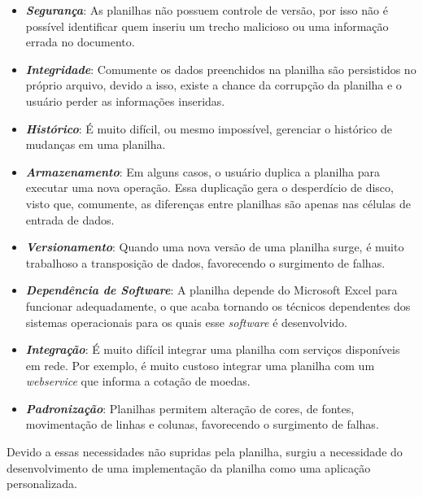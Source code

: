 \begin{itemize}
    
    \item \textit{\textbf{Segurança}}: As planilhas não possuem controle de versão, por isso não é possível identificar quem inseriu um trecho malicioso ou uma informação errada no documento.

    \item \textit{\textbf{Integridade}}: Comumente os dados preenchidos na planilha são persistidos no próprio arquivo, devido a isso, existe a chance da corrupção da planilha e o usuário perder as informações inseridas.
    
    \item \textit{\textbf{Histórico}}: É muito difícil, ou mesmo impossível, gerenciar o histórico de mudanças em uma planilha. 
    
    \item \textit{\textbf{Armazenamento}}: Em alguns casos, o usuário duplica a planilha para executar uma nova operação. Essa duplicação gera o desperdício de disco, visto que, comumente, as diferenças entre planilhas são apenas nas células de entrada de dados. 
    
    \item \textit{\textbf{Versionamento}}: Quando uma nova versão de uma planilha surge, é muito trabalhoso a transposição de dados, favorecendo o surgimento de falhas.
    
    \item \textit{\textbf{Dependência de Software}}: A planilha depende do Microsoft Excel para funcionar adequadamente, o que acaba tornando os técnicos dependentes dos sistemas operacionais para os quais esse \textit{software} é desenvolvido.
    
    \item \textit{\textbf{Integração}}: É muito difícil integrar uma planilha com serviços disponíveis em rede. Por exemplo, é muito custoso integrar uma planilha com um \textit{webservice} que informa a cotação de moedas.
    
    \item \textit{\textbf{Padronização}}: Planilhas permitem alteração de cores, de fontes, movimentação de linhas e colunas, favorecendo o surgimento de falhas.
    
\end{itemize}

Devido a essas necessidades não supridas pela planilha, surgiu a necessidade do desenvolvimento de uma implementação da planilha como uma aplicação personalizada.

